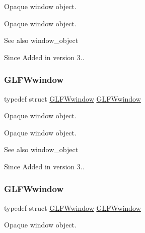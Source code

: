 Opaque window object. 

Opaque window object.

\begin{DoxySeeAlso}{See also}
window\+\_\+object
\end{DoxySeeAlso}
\begin{DoxySince}{Since}
Added in version 3.. 
\end{DoxySince}
\mbox{\label{group__window_ga3c96d80d363e67d13a41b5d1821f3242}} 
\subsubsection{\texorpdfstring{G\+L\+F\+Wwindow}{GLFWwindow}\hspace{0.1cm}{\footnotesize\ttfamily [2/5]}}
{\footnotesize\ttfamily typedef struct \hyperlink{group__window_ga3c96d80d363e67d13a41b5d1821f3242}{G\+L\+F\+Wwindow} \hyperlink{group__window_ga3c96d80d363e67d13a41b5d1821f3242}{G\+L\+F\+Wwindow}}



Opaque window object. 

Opaque window object.

\begin{DoxySeeAlso}{See also}
window\+\_\+object
\end{DoxySeeAlso}
\begin{DoxySince}{Since}
Added in version 3.. 
\end{DoxySince}
\mbox{\label{group__window_ga3c96d80d363e67d13a41b5d1821f3242}} 
\subsubsection{\texorpdfstring{G\+L\+F\+Wwindow}{GLFWwindow}\hspace{0.1cm}{\footnotesize\ttfamily [3/5]}}
{\footnotesize\ttfamily typedef struct \hyperlink{group__window_ga3c96d80d363e67d13a41b5d1821f3242}{G\+L\+F\+Wwindow} \hyperlink{group__window_ga3c96d80d363e67d13a41b5d1821f3242}{G\+L\+F\+Wwindow}}



Opaque window object. 

